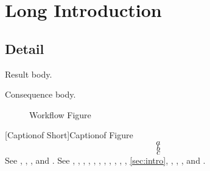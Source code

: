 \section[Short Intro]{Long Introduction}\label{sec:intro}
\subsection{Detail}\label{sub:detail}
\begin{oblemma}\label{obs:main}
Result body.
\end{oblemma}
\begin{obcor}\label{obc:main}
Consequence body.
\end{obcor}
\begin{figure}\caption[Workflow Short]{Workflow Figure}\label{fig:workflow}\end{figure}
[Captionof Short]{Captionof Figure}\label{fig:captionof}
\begin{equation}\label{eq:first}a\end{equation}
\begin{equation}\label{eq:second}b\end{equation}
\begin{equation}\label{eq:third}c\end{equation}
See , , , and .
See , , , , , , , , , , , \vref{sec:intro}, , , , and .
